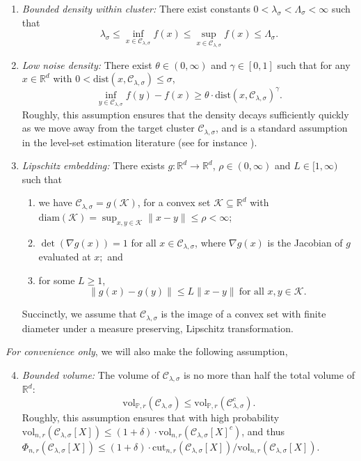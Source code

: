 \documentclass[11pt,twoside]{article}
\newcommand{\Reals}{\mathbb{R}}
\newcommand{\1}{\mathbf{1}}
\newcommand{\Rd}{\Reals^d}
\newcommand{\mc}[1]{\mathcal{#1}}
\newcommand{\Pbb}{\mathbb{P}}
\newcommand{\dist}{\mathrm{dist}}
\newcommand{\vol}{\mathrm{vol}}
\newcommand{\cut}{\mathrm{cut}}
\begin{document}
\begin{enumerate}[label=(A\arabic*)]
	\item
	\label{asmp:lambda_bounded_density}
	\emph{Bounded density within cluster:} There exist constants
	$0<\lambda_{\sigma}< \Lambda_{\sigma}<\infty$ such that 
	$$
	\lambda_{\sigma} \leq \inf_{x \in \mc{C}_{\lambda,\sigma}} f(x) \leq \sup_{x \in \mc{C}_{\lambda,\sigma}} f(x)
	\leq \Lambda_{\sigma}.
	$$
	
	\item 
	\label{asmp:low_noise_density}
	\emph{Low noise density:} There exist $\theta \in (0,\infty)$ and $\gamma \in
	[0,1]$ such that for any $x \in \Rd$ with $0 < \dist(x, \mc{C}_{\lambda,\sigma}) \leq \sigma$,     
	$$
	\inf_{y \in \mc{C}_{\lambda,\sigma}} f(y) - f(x) \geq  \theta \cdot \dist(x, \mc{C}_{\lambda,\sigma})^{\gamma}.  
	$$
	Roughly, this assumption ensures that the density decays sufficiently quickly
	as we move away from the target cluster $\mc{C}_{\lambda,\sigma}$, and is a standard assumption
	in the level-set estimation literature (see for instance \citet{singh2009}).
	
	\item
	\label{asmp:embedding}
	\emph{Lipschitz embedding:}
	There exists $g: \Reals^d \to \Reals^d$, $\rho \in (0,\infty)$ and $L \in [1,\infty)$ such that
	\begin{enumerate}
		\item we have $\mc{C}_{\lambda,\sigma} = g(\mathcal{K})$, for a convex set $\mathcal{K}
		\subseteq \Rd$ with $\mathrm{diam}(\mathcal{K}) = \sup_{x,y \in
			\mathcal{K}}\|x - y\| \leq \rho < \infty$;
		\item $\det(\nabla g (x)) = 1$ for all $x \in \mc{C}_{\lambda,\sigma}$, where $\nabla g(x)$ is
		the Jacobian of $g$ evaluated at $x;$ and 
		\item for some $L \geq 1$,   
		$$
		\|g(x) - g(y)\| \leq L \|x - y\| ~
		\text{for all $x,y \in \mathcal{K}$}. 
		$$
	\end{enumerate}
	Succinctly, we assume that $\mc{C}_{\lambda,\sigma}$ is the image of a convex set with finite
	diameter under a measure preserving, Lipschitz transformation. 
\end{enumerate}

\emph{For convenience only}, we will also make the following assumption, 
\begin{enumerate}[label=(A\arabic*)]
	\setcounter{enumi}{3}
	\item
	\label{asmp:bounded_volume}
	\emph{Bounded volume:}
	The volume of $\mc{C}_{\lambda,\sigma}$ is no more than half the total volume of $\Rd$:
	$$
	\vol_{\Pbb,r}(\mc{C}_{\lambda,\sigma}) \leq \vol_{\Pbb,r}(\mc{C}_{\lambda,\sigma}^c). 
	$$
	Roughly, this assumption ensures that with high probability $\vol_{n,r}(\mc{C}_{\lambda,\sigma}[X]) \leq (1 + \delta) \cdot \vol_{n,r}(\mc{C}_{\lambda,\sigma}[X]^c)$, and thus $\Phi_{n,r}(\mc{C}_{\lambda,\sigma}[X]) \leq (1 + \delta) \cdot \cut_{n,r}(\mc{C}_{\lambda,\sigma}[X])/\vol_{n,r}(\mc{C}_{\lambda,\sigma}[X])$. 
\end{enumerate}
\end{document}
